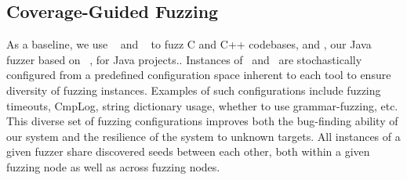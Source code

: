 \subsection{Coverage-Guided Fuzzing}
As a baseline, we use \afl~\cite{aflplusplus} and \libfuzzer~\cite{libfuzzer} to fuzz C and C++ codebases, and \jazzmine{}, our Java fuzzer based on \jazzer~\cite{jazzer}, for Java projects..
Instances of \afl\ and \jazzmine\ are stochastically configured from a predefined configuration space inherent to each tool to ensure diversity of fuzzing instances.
Examples of such configurations include fuzzing timeouts, CmpLog\cite{aschermann2019redqueen}, string dictionary usage, whether to use grammar-fuzzing, etc.
This diverse set of fuzzing configurations improves both the bug-finding ability of our system and the resilience of the system to unknown targets.
All instances of a given fuzzer share discovered seeds between each other, both within a given fuzzing node as well as across fuzzing nodes.